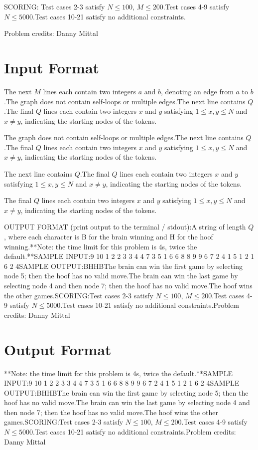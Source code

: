 \documentclass[12pt]{article}
\begin{document}
SCORING:
Test cases 2-3 satisfy $N\le 100$, $M\le 200$.Test cases 4-9 satisfy $N\le 5000$.Test cases 10-21 satisfy no additional constraints.


Problem credits: Danny Mittal



\section*{Input Format}
The next $M$ lines each contain two integers $a$ and $b$, denoting an edge from
$a$ to $b$.The graph does not contain self-loops or multiple edges.The next line contains $Q$.The final $Q$ lines each contain two integers $x$ and $y$ satisfying
$1\le x,y\le N$ and $x\neq y$, indicating the starting nodes of the tokens.

The graph does not contain self-loops or multiple edges.The next line contains $Q$.The final $Q$ lines each contain two integers $x$ and $y$ satisfying
$1\le x,y\le N$ and $x\neq y$, indicating the starting nodes of the tokens.

The next line contains $Q$.The final $Q$ lines each contain two integers $x$ and $y$ satisfying
$1\le x,y\le N$ and $x\neq y$, indicating the starting nodes of the tokens.

The final $Q$ lines each contain two integers $x$ and $y$ satisfying
$1\le x,y\le N$ and $x\neq y$, indicating the starting nodes of the tokens.

OUTPUT FORMAT (print output to the terminal / stdout):A string of length $Q$, where each character is B for the brain winning and H
for the hoof winning.**Note: the time limit for this problem is 4s, twice the default.**SAMPLE INPUT:9 10
1 2
2 3
3 4
4 7
3 5
1 6
6 8
8 9
9 6
7 2
4
1 5
1 2
1 6
2 4SAMPLE OUTPUT:BHHBThe brain can win the first game by selecting node 5; then the hoof has no valid
move.The brain can win the last game by selecting node 4 and then node 7; then the
hoof has no valid move.The hoof wins the other games.SCORING:Test cases 2-3 satisfy $N\le 100$, $M\le 200$.Test cases 4-9 satisfy $N\le 5000$.Test cases 10-21 satisfy no additional constraints.Problem credits: Danny Mittal

\section*{Output Format}
**Note: the time limit for this problem is 4s, twice the default.**SAMPLE INPUT:9 10
1 2
2 3
3 4
4 7
3 5
1 6
6 8
8 9
9 6
7 2
4
1 5
1 2
1 6
2 4SAMPLE OUTPUT:BHHBThe brain can win the first game by selecting node 5; then the hoof has no valid
move.The brain can win the last game by selecting node 4 and then node 7; then the
hoof has no valid move.The hoof wins the other games.SCORING:Test cases 2-3 satisfy $N\le 100$, $M\le 200$.Test cases 4-9 satisfy $N\le 5000$.Test cases 10-21 satisfy no additional constraints.Problem credits: Danny Mittal
\end{document}
